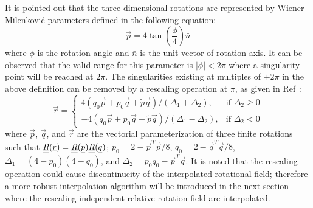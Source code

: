 It is pointed out that the three-dimensional rotations are represented by Wiener-Milenkovi\'c parameters \cite{Bauchau-etal:2008,Wang:GEBT2013} defined in the following equation:
 \begin{equation}
     \vec{p} = 4 \tan\left(\frac{\phi}{4} \right) \bar{n} 
     \label{WMParameter}
 \end{equation}
where $\phi$ is the rotation angle and $\bar{n}$ is the unit vector of
rotation axis. It can be observed that the valid range for this parameter is $|\phi| < 2 \pi$ where a singularity point will be reached at $2\pi$. The singularities existing at multiples of $\pm 2 \pi$ in the
above definition can be removed by a rescaling operation at $\pi$, as given in Ref~\cite{Bauchau-etal:2008}:
\begin{equation}
    \label{RescaledWM}
    \vec{r} = \begin{cases}
    4(q_0\vec{p} + p_0 \vec{q} + \tilde{p} \vec{q} ) / (\Delta_1 + \Delta_2), & \text{if } \Delta_2 \geq 0 \\
    -4(q_0\vec{p} + p_0 \vec{q} + \tilde{p} \vec{q} ) / (\Delta_1 - \Delta_2), & \text{if } \Delta_2 < 0
    \end{cases}
\end{equation}
where $\vec{p}$, $\vec{q}$, and $\vec{r}$ are the vectorial parameterization of three finite rotations such that $\underline{\underline{R}}(\underline{r}) = \underline{\underline{R}}(\underline{p}) \underline{\underline{R}}(\underline{q})$; $p_0 = 2 - \vec{p}^T \vec{p}/8$, $q_0 = 2 - \vec{q}^T \vec{q}/8$, $\Delta_1 = (4-p_0)(4-q_0)$, and $\Delta_2 = p_0 q_0 - \vec{p}^T \vec{q}$.
It is noted that the rescaling operation could cause discontinueity of the interpolated rotational field; therefore a more robust interpolation algorithm will be introduced in the next section where the rescaling-independent relative rotation field are interpolated. 

